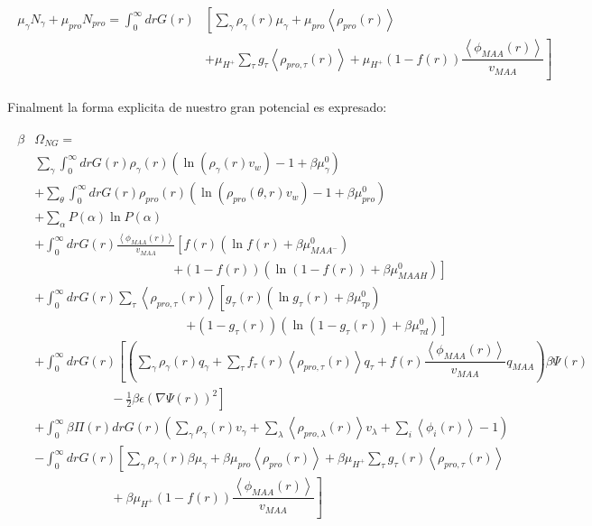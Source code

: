 \begin{align}
	\begin{aligned}
		\mu_\gamma N_\gamma + \mu_{pro} N_{pro} =\int_0^\infty drG(r)&\left[\sum_{\gamma }{\rho_\gamma(r)\mu_\gamma}
		+ \mu_{pro} \left<\rho_{pro}(r)\right> \right. \\
		& \left. +\mu_{H^+}\sum_{\tau}{g_\tau\left<\rho_{pro,\tau}(r)\right> } +\mu_{H^+}(1-f(r))\dfrac{\left<\phi_{MAA}(r)\right>}{v_{MAA}}\right]
	\end{aligned}
\end{align}


Finalment la forma explicita de nuestro gran potencial es expresado:

\begin{align}
	\begin{aligned}
		\beta&\Omega_{NG}=\\&  \sum_{\gamma}\int_0^\infty{dr G(r)\rho_\gamma(r)\left(\ln \left(\rho_\gamma (r)v_w\right) -1 + \beta\mu^0_\gamma\right)} \\
		& +\sum_\theta \int_0^\infty{dr G(r)\rho_{pro}(r)\left(\ln (\rho_{pro}(\theta,r)v_w)-1 + \beta\mu^0_{pro} \right)} \\
		& + \sum_{\alpha}{P(\alpha)\ln P(\alpha)} \\
		& +\int_0^\infty drG(r) \frac{\left<\phi_{MAA}(r)\right>}{v_{MAA}} \left[f(r)(\ln f(r)+ \beta\mu^0_{MAA^-})\right.\\
		&\qquad \qquad \qquad\qquad \qquad \quad \left.+(1-f(r))(\ln (1-f(r))+\beta\mu^0_{MAAH})\right] \\
		& +\int_0^\infty drG(r)\sum_\tau \left<\rho_{pro,\tau}(r)\right> \left[g_\tau(r)(\ln g_\tau(r)+ \beta\mu^0_{\tau p})\right.\\
		&\qquad\qquad \qquad\qquad \qquad \qquad\left.+(1-g_\tau(r))(\ln (1-g_\tau(r))+\beta\mu^0_{\tau d})\right] \\
		& +  \int_0^\infty drG(r)\left[\left(\sum_{\gamma } {\rho_\gamma(r) q_\gamma + \sum_\tau{f_\tau(r) \left<\rho_{pro,\tau}(r)\right> q_\tau} +  f(r)\dfrac{\left<\phi_{MAA}(r)\right>}{v_{MAA}}q_{MAA}}\right)\beta\Psi(r) \right.\\  &\left. \hspace{6em}-\frac{1}{2}\beta\epsilon(\nabla\Psi(r))^2 \right]\\
		&+ \int_0^\infty \beta\Pi(r) drG(r){\left(\sum_{\gamma}\rho_\gamma(r) v_\gamma + \sum_{\lambda}{\left<\rho_{pro,\lambda}(r)\right>}{v_\lambda} + \sum_i\left<\phi_i(r)\right> -1\right)}\\
		& -\int_0^\infty drG(r)\left[\sum_{\gamma }{\rho_\gamma(r)\beta\mu_\gamma}
		+ \beta\mu_{pro} \left<\rho_{pro}(r)\right>
		+\beta\mu_{H^+}\sum_{\tau}{g_\tau(r)\left<\rho_{pro,\tau}(r)\right> } \right.\\
		& \left. \hspace{6em} +\beta\mu_{H^+}(1-f(r))\dfrac{\left<\phi_{MAA}(r)\right>}{v_{MAA}}\right]%
	\end{aligned}
	\label{eq:esf:potential-energy}
\end{align}

